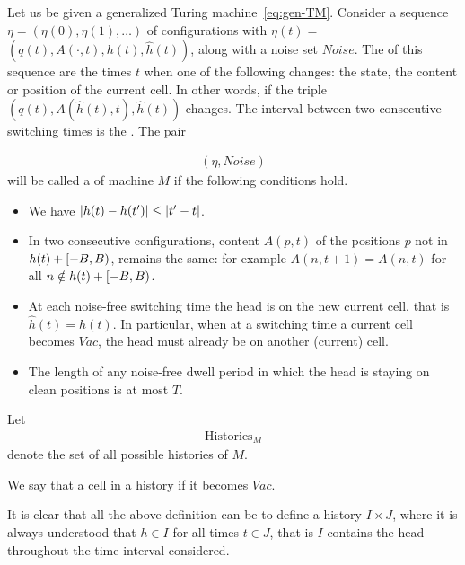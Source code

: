 \documentclass[12pt]{memoir}
\renewcommand{\le}{\leq}
\def\B{B}
\newcommand{\Vacant}{\mathit{Vac}}
\newcommand{\h}{h}
\newcommand{\hc}{\hat h}
\newcommand{\Noise}{\mathit{Noise}}
\newcommand{\Tu}{T}
\newcommand{\Histories}{\mathrm{Histories}}
\begin{document}
\begin{definition}[History]\label{def:history}
  \begin{sloppypar}
    Let us be given a generalized Turing machine~\eqref{eq:gen-TM}.
    Consider a sequence \( \eta = (\eta(0), \eta(1), \dots) \) of configurations with
    \( \eta(t) = \) \( (q(t), A(\cdot, t), \h(t), \hc(t)) \), along with a noise set \( \Noise \).
    The  of this sequence 
are the times \( t \) when one of the following changes:
the state, the content or position of the current cell.
In other words, if the triple \( (q(t),A(\hc(t),t), \hc(t)) \) changes.
The interval between two consecutive switching times is the .
The pair
      \end{sloppypar}
    \begin{align*}
       (\eta,\Noise)
    \end{align*}
    will be called a  of machine \( M \) if the following conditions hold.
        \begin{itemize}
            \item We have \( \abs{\h(t) - \h(t')} \le \abs{t' - t} \).

            \item In two consecutive configurations, content \( A(p,t) \) of the positions \( p \)
              not in \( \h(t) + \lint{-\B}{\B} \), remains the same: for example
                  \( A(n,t+1) = A(n,t) \) for all \( n \notin \h(t) + \lint{-\B}{\B} \).
            \item At each noise-free switching time the head is on the new current cell, that is
\( \hc(t)=\h(t) \).
In particular, when at a switching time a current cell becomes
\( \Vacant \), the head must already be on another (current) cell.

            \item The length of any noise-free 
dwell period in which the head is staying on clean positions is at most \( \Tu \).

        \end{itemize}
    Let
        \begin{align*}
            \Histories_{M}
        \end{align*}
    denote the set of all possible histories of \( M \).

We say that a cell  in a history if it becomes \( \Vacant \).

It is clear that all the above definition can be  to define a history
 \( I\times J \), 
where it is always understood that \( \h\in I \) for all times \( t\in J \),
that is \( I \) contains the head throughout the time interval considered.

\end{definition}
\end{document}
